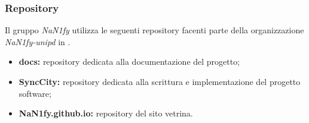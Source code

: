 \subsubsection{Repository}

Il gruppo \textit{NaN1fy} utilizza le seguenti repository facenti parte della organizzazione \textit{NaN1fy-unipd} in .


\begin{itemize}
    \item \textbf{docs:} repository dedicata alla documentazione del progetto;
    \item \textbf{SyncCity:} repository dedicata alla scrittura e implementazione del progetto software;
    \item \textbf{NaN1fy.github.io:} repository del sito vetrina.
\end{itemize}

